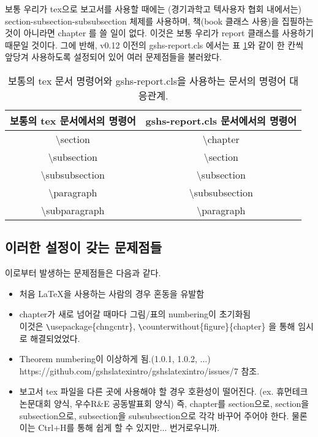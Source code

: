 \documentclass{gshs-report-v1.2}
\begin{document}
보통 우리가 tex으로 보고서를 사용할 때에는 (경기과학고 텍사용자 협회 내에서는) section-subsection-subsubsection 체제를 사용하며, 책(book 클래스 사용)을 집필하는 것이 아니라면 chapter 를 쓸 일이 없다. 이것은 보통 우리가 report 클래스를 사용하기 때문일 것이다. 그에 반해, v0.12 이전의 gshs-report.cls 에서는 표 \ref{correlation}와 같이 한 칸씩 앞당겨 사용하도록 설정되어 있어 여러 문제점들을 불러왔다.

\begin{table}[h]
	\caption{보통의 tex 문서 명령어와 gshs-report.cls을 사용하는 문서의 명령어 대응관계.}
	\label{correlation}
	\begin{center}
		\begin{tabular}{|c|c|}
			\hline
			보통의 tex 문서에서의 명령어 & gshs-report.cls 문서에서의 명령어 \\
			\hline
			\textbackslash section & \textbackslash chapter \\
			\hline
			\textbackslash subsection & \textbackslash section \\
			\hline
			\textbackslash subsubsection & \textbackslash subsection \\
			\hline
			\textbackslash paragraph & \textbackslash subsubsection \\
			\hline
			\textbackslash subparagraph & \textbackslash paragraph \\
			\hline
		\end{tabular}
	\end{center}
\end{table}

\subsection{이러한 설정이 갖는 문제점들}
이로부터 발생하는 문제점들은 다음과 같다.
\begin{itemize}
\item 처음 \LaTeX 을 사용하는 사람의 경우 혼동을 유발함
\item chapter가 새로 넘어갈 때마다 그림/표의 numbering이 초기화됨 \\
이것은 \verb+\+usepackage\{chngcntr\}, \verb+\+counterwithout\{figure\}\{chapter\} 을 통해 임시로 해결되었었다.
\item Theorem numbering이 이상하게 됨.(1.0.1,  1.0.2, ...) \\
https://github.com/gshslatexintro/gshslatexintro/issues/7 참조.
\item 보고서 tex 파일을 다른 곳에 사용해야 할 경우 호환성이 떨어진다. (ex. 휴먼테크논문대회 양식, 우수R\&E 공동발표회 양식) 즉, chapter를 section으로, section을 subsection으로, subsection을 subsubsection으로 각각 바꾸어 주어야 한다. 물론 이는 Ctrl+H를 통해 쉽게 할 수 있지만... 번거로우니까.
\end{itemize}
\end{document}
